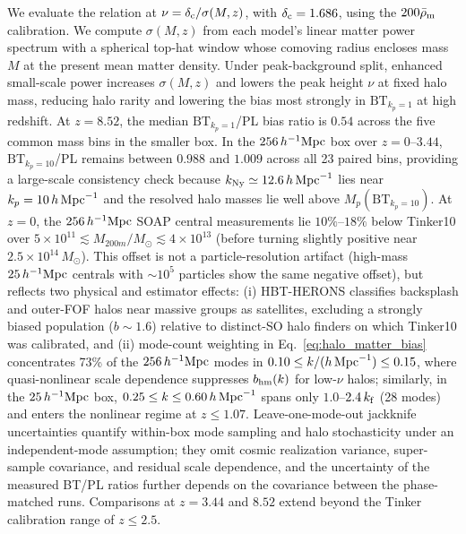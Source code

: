 \documentclass[
 reprint,
 superscriptaddress,
 nofootinbib,
 nobibnotes,
 amsmath,
 amssymb,
 aps,
 prd,
 floatfix,
 longbibliography
]{revtex4-2}
\DeclareRobustCommand{\change}[1]{#1}
\DeclareRobustCommand{\BTKPone}{\ensuremath{\mathrm{BT}_{k_p=1}}}
\DeclareRobustCommand{\BTKPten}{\ensuremath{\mathrm{BT}_{k_p=10}}}
\begin{document}
\change{We evaluate the \citet{Tinker2010HaloBias} relation at \(\nu=\delta_{\rm c}/\sigma(M,z)\), with \(\delta_{\rm c}=1.686\), using the \(200\bar\rho_{\rm m}\) calibration. We compute \(\sigma(M,z)\) from each model's linear matter power spectrum with a spherical top-hat window whose comoving radius encloses mass \(M\) at the present mean matter density. Under peak-background split, enhanced small-scale power increases \(\sigma(M,z)\) and lowers the peak height \(\nu\) at fixed halo mass, reducing halo rarity and lowering the bias most strongly in \BTKPone{} at high redshift. At \(z=8.52\), the median \BTKPone{}/PL bias ratio is \(0.54\) across the five common mass bins in the smaller box. In the \(256\,h^{-1}{\rm Mpc}\) box over \(z=0\)--\(3.44\), \BTKPten{}/PL remains between \(0.988\) and \(1.009\) across all 23 paired bins, providing a large-scale consistency check because \(k_{\rm Ny}\simeq12.6\,h\,{\rm Mpc}^{-1}\) lies near \(k_p=10\,h\,{\rm Mpc}^{-1}\) and the resolved halo masses lie well above \(M_p(\BTKPten{})\). At \(z=0\), the \(256\,h^{-1}{\rm Mpc}\) \textsc{SOAP} central measurements lie \(10\%\)--\(18\%\) below Tinker10 over \(5\times10^{11}\lesssim M_{200m}/M_\odot\lesssim4\times10^{13}\) (before turning slightly positive near \(2.5\times10^{14}\,M_\odot\)). This offset is not a particle-resolution artifact (high-mass \(25\,h^{-1}{\rm Mpc}\) centrals with \(\sim10^5\) particles show the same negative offset), but reflects two physical and estimator effects: (i) \textsc{HBT-HERONS} classifies backsplash and outer-FOF halos near massive groups as satellites, excluding a strongly biased population (\(b\sim1.6\)) relative to distinct-SO halo finders on which Tinker10 was calibrated, and (ii) mode-count weighting in Eq.~\eqref{eq:halo_matter_bias} concentrates 73\% of the \(256\,h^{-1}{\rm Mpc}\) modes in \(0.10\le k/(h\,{\rm Mpc}^{-1})\le0.15\), where quasi-nonlinear scale dependence suppresses \(b_{\rm hm}(k)\) for low-\(\nu\) halos; similarly, in the \(25\,h^{-1}{\rm Mpc}\) box, \(0.25\le k\le0.60\,h\,{\rm Mpc}^{-1}\) spans only \(1.0\)--\(2.4\,k_{\rm f}\) (28 modes) and enters the nonlinear regime at \(z\le1.07\). Leave-one-mode-out jackknife uncertainties quantify within-box mode sampling and halo stochasticity under an independent-mode assumption; they omit cosmic realization variance, super-sample covariance, and residual scale dependence, and the uncertainty of the measured BT/PL ratios further depends on the covariance between the phase-matched runs. Comparisons at \(z=3.44\) and \(8.52\) extend beyond the Tinker calibration range of \(z\le2.5\).}
\end{document}
